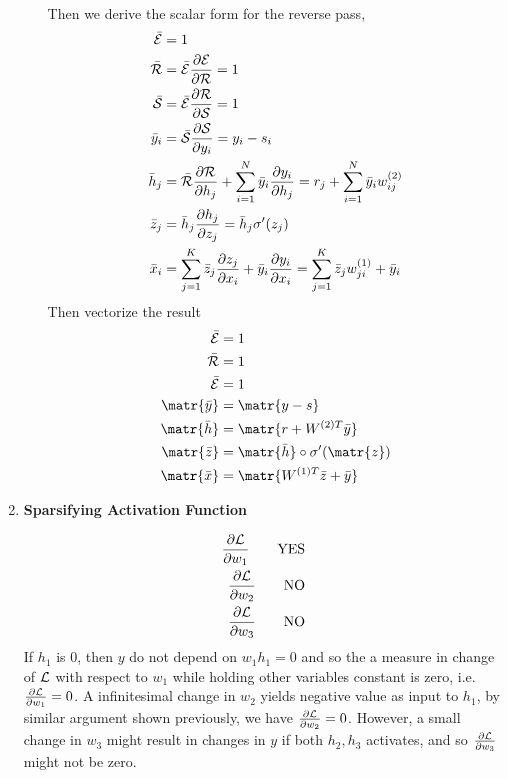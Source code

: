\documentclass[11pt]{article}
\begin{document}
\begin{enumerate}
\begin{enumerate}
\begin{solution}
\begin{align*}
        \end{align*}
        Then we derive the scalar form for the reverse pass, 
        \begin{align*}
            \bar{\mathcal{E}} &= 1 \\
            \bar{\mathcal{R}} &= \bar{\mathcal{E}} \frac{\partial \mathcal{E}}{\partial \mathcal{R}} = 1 \\ 
            \bar{\mathcal{S}} &= \bar{\mathcal{E}} \frac{\partial \mathcal{R}}{\partial \mathcal{S}} = 1 \\
            \bar{y}_i   &= \bar{\mathcal{S}} \frac{\partial \mathcal{S}}{\partial y_i} = y_i - s_i \\ 
            \bar{h}_j   &= \bar{\mathcal{R}} \frac{\partial \mathcal{R}}{\partial h_j} + \sum_{i=1}^N \bar{y}_i \frac{\partial y_i}{\partial h_j} = r_j + \sum_{i=1}^N \bar{y}_i w_{ij}^{(2)} \\
            \bar{z}_j   &= \bar{h}_j \frac{\partial h_j}{\partial z_j} = \bar{h}_j \sigma'(z_j) \\
            \bar{x}_i   &= \sum_{j=1}^K \bar{z}_j \frac{\partial z_j}{\partial x_i} + \bar{y}_i \frac{\partial y_i}{\partial x_i} = \sum_{j=1}^K \bar{z}_j w_{ji}^{(1)} + \bar{y}_i
        \end{align*}
        Then vectorize the result 
        \begin{align*}
            \bar{\calE} &= 1\\
            \bar{\calR} &= 1\\
            \bar{\calE} &= 1 \\
            \matr{\bar{y}} &= \matr{y-s} \\
            \matr{\bar{h}} &= \matr{r + W^{(2)T} \bar{y}} \\
            \matr{\bar{z}} &= \matr{\bar{h}} \circ \sigma'(\matr{z}) \\ 
            \matr{\bar{x}} &=  \matr{W^{(1)T} \bar{z} + \bar{y}} \\ 
        \end{align*}
    \end{solution}
\end{enumerate}

\item \textbf{Sparsifying Activation Function} 
\begin{solution}
    \begin{align*}
        \frac{\partial \mathcal{L}}{\partial w_1} \quad \quad \text{YES} \\ 
        \frac{\partial \mathcal{L}}{\partial w_2} \quad \quad \text{NO} \\ 
        \frac{\partial \mathcal{L}}{\partial w_3} \quad \quad \text{NO} \\ 
    \end{align*}
    If $h_1$ is 0, then $y$ do not depend on $w_1h_1 = 0$ and so the a measure in change of $\mathcal{L}$ with respect to $w_1$ while holding other variables constant is zero, i.e. $\frac{\partial \mathcal{L}}{\partial w_1} = 0$. A infinitesimal change in $w_2$ yields negative value as input to $h_1$, by similar argument shown previously, we have $\frac{\partial \mathcal{L}}{\partial w_2} = 0$. However, a small change in $w_3$ might result in changes in $y$ if both $h_2, h_3$ activates, and so $\frac{\partial \mathcal{L}}{\partial w_3}$ might not be zero.
    

\end{solution}
\end{enumerate}
\end{document}
